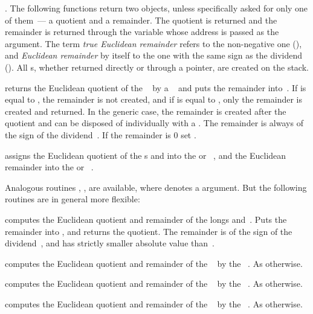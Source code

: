 . The following functions return two objects,
unless specifically asked for only one of them~--- a quotient and a remainder.
The quotient is returned and the remainder is returned through the variable
whose address is passed as the  argument. The term \emph{true
Euclidean remainder} refers to the non-negative one (), and
\emph{Euclidean remainder} by itself to the one with the same sign as the
dividend (). All s, whether returned directly or through a
pointer, are created on the stack.

 returns the Euclidean quotient of the
~ by a ~ and puts the remainder
into~. If  is equal to , the remainder is not
created, and if  is equal to  , only the remainder is
created and returned. In the generic case, the remainder is created after the
quotient and can be disposed of individually with a . The
remainder is always of the sign of the dividend~. If the remainder
is $0$ set .

 assigns the Euclidean
quotient of the s  and  into the  or
~, and the Euclidean remainder into the  or
~.

\noindent Analogous routines \kbd{[z]}, \kbd{[z]},
\kbd{[z]} are available, where  denotes a 
argument. But the following routines are in general more flexible:

 computes the Euclidean
quotient and remainder of the longs  and~. Puts the remainder
into , and returns the quotient. The remainder is of the sign of the
dividend~, and has strictly smaller absolute value than~.

 computes the Euclidean
quotient and remainder of the ~ by the ~. As
 otherwise.

 computes the Euclidean quotient
and remainder of the ~ by the ~. As
 otherwise.

 computes the Euclidean quotient
and remainder of the ~ by the ~. As
 otherwise.

